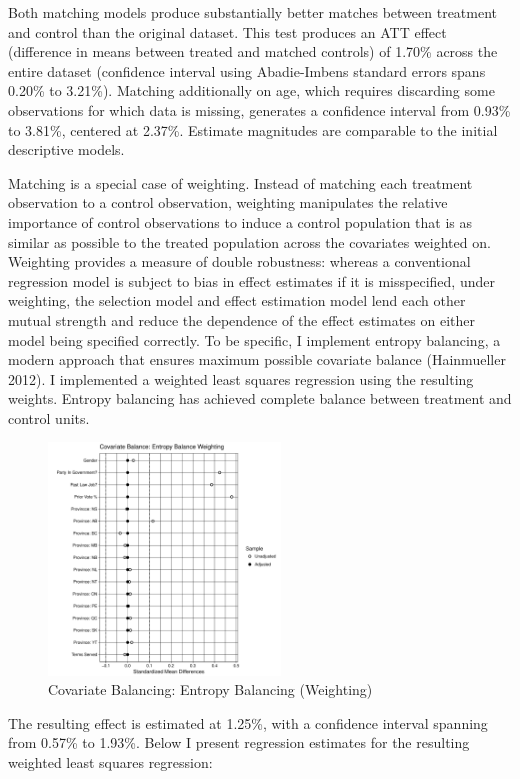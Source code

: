 \documentclass[letter,12pt]{article}
\begin{document}
Both matching models produce substantially better matches between treatment and control than the original dataset. This test produces an ATT effect (difference in means between treated and matched controls) of 1.70\% across the entire dataset (confidence interval using Abadie-Imbens standard errors spans 0.20\% to 3.21\%). Matching additionally on age, which requires discarding some observations for which data is missing, generates a confidence interval from 0.93\% to 3.81\%, centered at 2.37\%. Estimate magnitudes are comparable to the initial descriptive models.

Matching is a special case of weighting. Instead of matching each treatment observation to a control observation, weighting manipulates the relative importance of control observations to induce a control population that is as similar as possible to the treated population across the covariates weighted on. Weighting provides a measure of double robustness: whereas a conventional regression model is subject to bias in effect estimates if it is misspecified, under weighting, the selection model and effect estimation model lend each other mutual strength and reduce the dependence of the effect estimates on either model being specified correctly. To be specific, I implement entropy balancing, a modern approach that ensures maximum possible covariate balance (Hainmueller 2012). I implemented a weighted least squares regression using the resulting weights. Entropy balancing has achieved complete balance between treatment and control units.

\begin{figure}
\centering
\caption{Covariate Balancing: Entropy Balancing (Weighting)}
\includegraphics[width=0.55\textwidth]{"Includes/love_plot_weight"}
\end{figure}

The resulting effect is estimated at 1.25\%, with a confidence interval spanning from 0.57\% to 1.93\%. Below I present regression estimates for the resulting weighted least squares regression:
\end{document}
